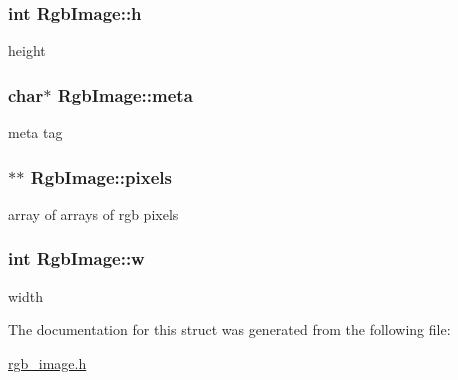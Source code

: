 \subsubsection[{h}]{\setlength{\rightskip}{0pt plus 5cm}int Rgb\+Image\+::h}\label{structRgbImage_a889ca401aeb77b97a42f5202fbe559ef}


height 

\hypertarget{structRgbImage_a20d971d0023a127ad333b0fdaa55e601}{}
\subsubsection[{meta}]{\setlength{\rightskip}{0pt plus 5cm}char$\ast$ Rgb\+Image\+::meta}\label{structRgbImage_a20d971d0023a127ad333b0fdaa55e601}


meta tag 

\hypertarget{structRgbImage_a846169a16a9b57f045ceeb92801537c5}{}
\subsubsection[{pixels}]{$\ast$$\ast$ Rgb\+Image\+::pixels}\label{structRgbImage_a846169a16a9b57f045ceeb92801537c5}


array of arrays of rgb pixels 

\hypertarget{structRgbImage_a8f1e2b1a24a23e01058dd4b90209f7f9}{}
\subsubsection[{w}]{\setlength{\rightskip}{0pt plus 5cm}int Rgb\+Image\+::w}\label{structRgbImage_a8f1e2b1a24a23e01058dd4b90209f7f9}


width 



The documentation for this struct was generated from the following file\+:\begin{DoxyCompactItemize}
\item 
\hyperlink{rgb__image_8h}{rgb\+\_\+image.\+h}\end{DoxyCompactItemize}
